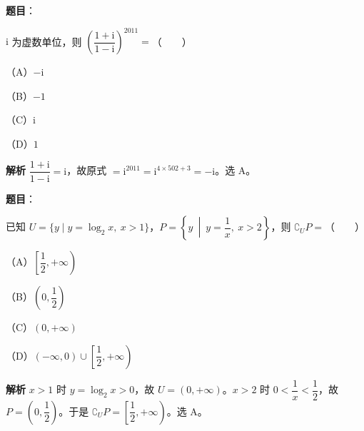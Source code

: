 
\begin{answer}

\textbf{题目}：

$\mathrm i$ 为虚数单位，则 $\left(\dfrac{1+\mathrm i}{1-\mathrm i}\right)^{2011}=$\mbox{（　　）}

（A）$-\mathrm i$

（B）$-1$

（C）$\mathrm i$

（D）$1$

\textbf{解析}
$\dfrac{1+\mathrm i}{1-\mathrm i}=\mathrm i$，故原式 $=\mathrm i^{2011}=\mathrm i^{4\times502+3}=-\mathrm i$。选 A。


\end{answer}
\begin{answer}

\textbf{题目}：

已知 $U=\{y\mid y=\log_2x,\ x>1\}$，$P=\left\{y\ \middle|\ y=\dfrac1x,\ x>2\right\}$，则 $\complement_UP=$\mbox{（　　）}

（A）$\left[\dfrac12,+\infty\right)$

（B）$\left(0,\dfrac12\right)$

（C）$(0,+\infty)$

（D）$(-\infty,0)\cup\left[\dfrac12,+\infty\right)$

\textbf{解析}
$x>1$ 时 $y=\log_2x>0$，故 $U=(0,+\infty)$。$x>2$ 时 $0<\dfrac1x<\dfrac12$，故 $P=\left(0,\dfrac12\right)$。于是 $\complement_UP=\left[\dfrac12,+\infty\right)$。选 A。


\end{answer}
